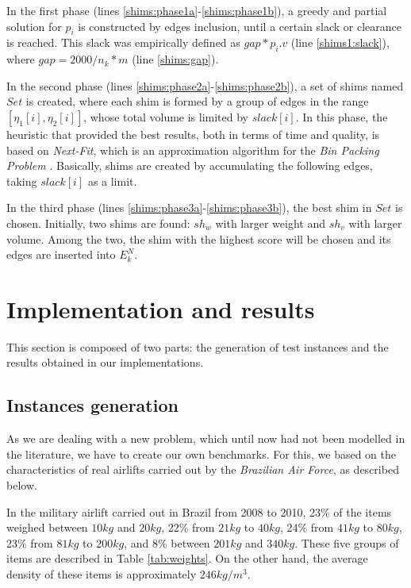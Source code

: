 \documentclass[preprint,authoryear]{elsarticle}
\begin{document}
In the first phase (lines \ref{shims:phase1a}-\ref{shims:phase1b}), a greedy and partial solution for $p_i$\/ is constructed by edges inclusion, until a certain slack or clearance is reached. This slack was empirically defined as $gap * p_i.v$\/ (line \ref{shims1:slack}), where $gap = 2000/n_k*m$\/ (line \ref{shims:gap}).

In the second phase (lines \ref{shims:phase2a}-\ref{shims:phase2b}), a set of shims named $Set$\/ is created, where each shim is formed by a group of edges in the range $[\eta_1[i],\eta_2[i]]$, whose total volume is limited by $slack[i]$. In this phase, the heuristic that provided the best results, both in terms of time and quality, is based on {\it Next-Fit}, which is an approximation algorithm for the {\it Bin Packing Problem}\/ \cite{JohnsonGarey1985}. Basically, shims are created by accumulating the following edges, taking $slack[i]$\/ as a limit.

In the third phase (lines \ref{shims:phase3a}-\ref{shims:phase3b}), the best shim in $Set$\/ is chosen. Initially, two shims are found: $sh_w$\/ with larger weight and $sh_v$\/ with larger volume. Among the two, the shim with the highest score will be chosen and its edges are inserted into $E^N_k$.


\section{Implementation and results}
\label{sec6}

This section is composed of two parts: the generation of test instances and the results obtained in our implementations.


\subsection{Instances generation}
\label{items}


As we are dealing with a new problem, which until now had not been modelled in the literature, we have to create our own benchmarks. For this, we based on the characteristics of real airlifts carried out by the {\em Brazilian Air Force}, as described below.

In the military airlift carried out in Brazil from 2008 to 2010, 23\% of the items weighed between $10kg$ and $20kg$, 22\% from $21kg$ to $40kg$, 24\% from $41kg$ to $80kg$, 23\% from $81kg$ to $200kg$, and 8\% between $201kg$ and $340kg$. These five groups of items are described in Table \ref{tab:weights}. On the other hand, the average density of these items is approximately $246 kg/m^3$.
\end{document}
